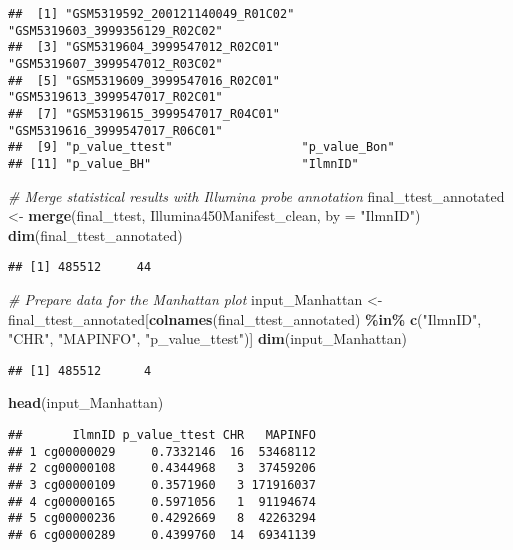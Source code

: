 \documentclass[
]{article}
\newenvironment{Shaded}{\begin{snugshade}}{\end{snugshade}}
\newcommand{\AttributeTok}[1]{\textcolor[rgb]{0.13,0.29,0.53}{#1}}
\newcommand{\CommentTok}[1]{\textcolor[rgb]{0.56,0.35,0.01}{\textit{#1}}}
\newcommand{\FunctionTok}[1]{\textcolor[rgb]{0.13,0.29,0.53}{\textbf{#1}}}
\newcommand{\NormalTok}[1]{#1}
\newcommand{\OtherTok}[1]{\textcolor[rgb]{0.56,0.35,0.01}{#1}}
\newcommand{\SpecialCharTok}[1]{\textcolor[rgb]{0.81,0.36,0.00}{\textbf{#1}}}
\newcommand{\StringTok}[1]{\textcolor[rgb]{0.31,0.60,0.02}{#1}}
\begin{document}
\begin{verbatim}
##  [1] "GSM5319592_200121140049_R01C02" "GSM5319603_3999356129_R02C02"  
##  [3] "GSM5319604_3999547012_R02C01"   "GSM5319607_3999547012_R03C02"  
##  [5] "GSM5319609_3999547016_R02C01"   "GSM5319613_3999547017_R02C01"  
##  [7] "GSM5319615_3999547017_R04C01"   "GSM5319616_3999547017_R06C01"  
##  [9] "p_value_ttest"                  "p_value_Bon"                   
## [11] "p_value_BH"                     "IlmnID"
\end{verbatim}

\begin{Shaded}
\begin{Highlighting}[]
\CommentTok{\# Merge statistical results with Illumina probe annotation}
\NormalTok{final\_ttest\_annotated }\OtherTok{\textless{}{-}} \FunctionTok{merge}\NormalTok{(final\_ttest, Illumina450Manifest\_clean, }\AttributeTok{by =}
                                 \StringTok{"IlmnID"}\NormalTok{)}
\FunctionTok{dim}\NormalTok{(final\_ttest\_annotated)}
\end{Highlighting}
\end{Shaded}

\begin{verbatim}
## [1] 485512     44
\end{verbatim}

\begin{Shaded}
\begin{Highlighting}[]
\CommentTok{\# Prepare data for the Manhattan plot}
\NormalTok{input\_Manhattan }\OtherTok{\textless{}{-}}\NormalTok{ final\_ttest\_annotated[}\FunctionTok{colnames}\NormalTok{(final\_ttest\_annotated) }\SpecialCharTok{\%in\%} \FunctionTok{c}\NormalTok{(}\StringTok{"IlmnID"}\NormalTok{, }\StringTok{"CHR"}\NormalTok{, }\StringTok{"MAPINFO"}\NormalTok{, }\StringTok{"p\_value\_ttest"}\NormalTok{)]}
\FunctionTok{dim}\NormalTok{(input\_Manhattan)}
\end{Highlighting}
\end{Shaded}

\begin{verbatim}
## [1] 485512      4
\end{verbatim}

\begin{Shaded}
\begin{Highlighting}[]
\FunctionTok{head}\NormalTok{(input\_Manhattan)}
\end{Highlighting}
\end{Shaded}

\begin{verbatim}
##       IlmnID p_value_ttest CHR   MAPINFO
## 1 cg00000029     0.7332146  16  53468112
## 2 cg00000108     0.4344968   3  37459206
## 3 cg00000109     0.3571960   3 171916037
## 4 cg00000165     0.5971056   1  91194674
## 5 cg00000236     0.4292669   8  42263294
## 6 cg00000289     0.4399760  14  69341139
\end{verbatim}
\end{document}
